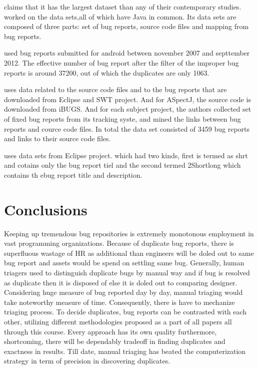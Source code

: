 \documentclass[]{sig-alternate-05-2015}
\begin{document}
\cite{Sun2011} claims that it has the largest dataset than any of their contemporary studies. \cite{Nguyen} worked on the data sets,all of which have Java in common. Its data sets are composed of three parts: set of bug reports, source code files and mapping from bug reports. \newline

\cite{Alipour2013} used bug reports submitted for android between november 2007 and septtember 2012. The effective number of bug report after the filter of the improper bug reports is around 37200, out of which the duplicates are only 1063. \newline

\cite{Wong} uses data related to the source code files and to the bug reports that are downloaded from Eclipse and SWT project. And for ASpectJ, the source code is downloaded from iBUGS. And for each subject project, the authors collected set of fixed bug reports from its tracking syste, and mined the links between bug reports and cource code files. In total the data set consisted of 3459 bug reports and links to their source code files. \newline

\cite{Klabbankoh2010} uses data sets from Eclipse project. which had two kinds, first is termed as shrt and cotains only the bug report tiel and the second termed 2Shortlong which contains th ebug report title and description.
\section{Conclusions}

Keeping up tremendous bug repositories is extremely monotonous employment in vast programming organizations. Because of duplicate bug reports, there is superfluous wastage of HR as additional than engineers will be doled out to same bug report and assets would be spend on settling same bug. Generally, human triagers used to distinguish duplicate bugs by manual way and if bug is resolved as duplicate then it is disposed of else it is doled out to comparing designer. Considering huge measure of bug reported day by day, manual triaging would take noteworthy measure of time. Consequently, there is have to mechanize triaging process. To decide duplicates, bug reports can be contrasted with each other, utilizing different methodologies proposed as a part of all papers all through this course. Every approach has its own quality furthermore, shortcoming, there will be dependably tradeoff in finding duplicates and exactness in results. Till date, manual triaging has beated the computerization strategy in term of precision in discovering duplicates.
\end{document}
